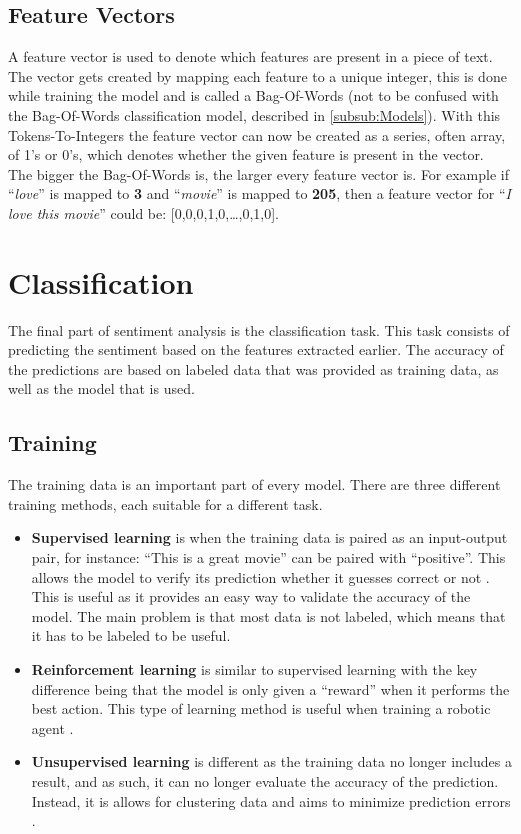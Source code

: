 \subsection{Feature Vectors}\label{sub:FeatureVector}
A feature vector is used to denote which features are present in a piece of
text. The vector gets created by mapping each feature to a unique integer, this
is done while training the model and is called a Bag-Of-Words (not to be
confused with the Bag-Of-Words classification model, described in
\autoref{subsub:Models}). With this Tokens-To-Integers the feature vector can
now be created as a series, often array, of 1's or 0's, which denotes whether
the given feature is present in the vector. The bigger the Bag-Of-Words is, the
larger every feature vector is. For example if ``\textit{love}'' is mapped to
\textbf{3} and ``\textit{movie}'' is mapped to \textbf{205}, then a feature
vector for ``\textit{I love this movie}'' could be: [0,0,0,1,0,\ldots,0,1,0].



\section{Classification}\label{sec:Class}
The final part of sentiment analysis is the classification task. This task
consists of predicting the sentiment based on the features extracted earlier.
The accuracy of the predictions are based on labeled data that was provided as
training data, as well as the model that is used. 

\subsection{Training}\label{subsec:Train}
The training data is an important part of every model. There are three
different training methods, each suitable for a different task.

\begin{itemize}
  \item \textbf{Supervised learning} is when the training data is paired as an
  input-output pair, for instance: ``This is a great movie'' can be paired with
  ``positive''. This allows the model to verify its prediction whether it
  guesses correct or not \citep[Ch. 7.0]{MIBook}. This is useful as it provides
  an easy way to validate the accuracy of the model. The main problem is that
  most data is not labeled, which means that it has to be labeled to be useful.
  \item \textbf{Reinforcement learning} is similar to supervised learning with
  the key difference being that the model is only given a ``reward'' when it
  performs the best action. This type of learning method is useful when
  training a robotic agent \citep{Reinforcement}.
  \item \textbf{Unsupervised learning} is different as the training data no
  longer includes a result, and as such, it can no longer evaluate the accuracy
  of the prediction. Instead, it is allows for clustering data and aims to
  minimize prediction errors \citep[Ch. 11.1]{MIBook}.
\end{itemize}

